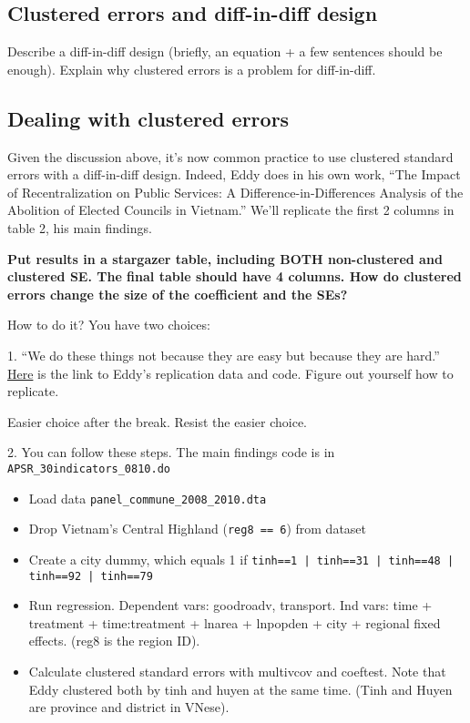 \documentclass{article}\usepackage[]{graphicx}\usepackage[]{color}
\begin{document}
\subsection{Clustered errors and diff-in-diff design}

Describe a diff-in-diff design (briefly, an equation + a few sentences should be enough). Explain why clustered errors is a problem for diff-in-diff.

\subsection{Dealing with clustered errors}

Given the discussion above, it's now common practice to use clustered standard errors with a diff-in-diff design. Indeed, Eddy does in his own work, ``The Impact of Recentralization on Public Services: A Difference-in-Differences Analysis of the Abolition of Elected Councils in Vietnam.'' We'll replicate the first 2 columns in table 2, his main findings.

\textbf{Put results in a stargazer table, including BOTH non-clustered and clustered SE. The final table should have 4 columns. How do clustered errors change the size of the coefficient and the SEs?}

How to do it? You have two choices:

1. ``We do these things not because they are easy but because they are hard.'' \href{https://dataverse.harvard.edu/dataset.xhtml?persistentId=doi:10.7910/DVN/IUG2C4}{Here} is the link to Eddy's replication data and code. Figure out yourself how to replicate.

Easier choice after the break. Resist the easier choice.

\pagebreak

2. You can follow these steps. The main findings code is in \verb`APSR_30indicators_0810.do`

\begin{itemize}
\item Load data \verb`panel_commune_2008_2010.dta`
\item Drop Vietnam's Central Highland (\verb`reg8 == 6`) from dataset
\item Create a city dummy, which equals 1 if \verb`tinh==1 | tinh==31 | tinh==48 | tinh==92 | tinh==79`
\item Run regression. Dependent vars: goodroadv, transport. Ind vars: time + treatment + time:treatment + lnarea + lnpopden + city + regional fixed effects. (reg8 is the region ID).
\item Calculate clustered standard errors with multivcov and coeftest. Note that Eddy clustered both by tinh and huyen at the same time. (Tinh and Huyen are province and district in VNese).
\end{itemize}
\end{document}
